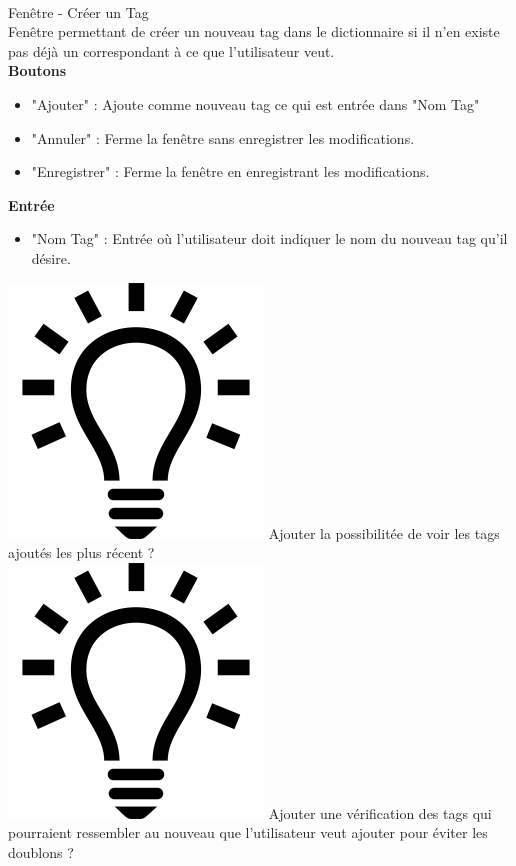 \documentclass[11pt,french,a4paper]{report}
\begin{document}
\dotfill \\

\Large Fenêtre - Créer un Tag\normalsize \\
    Fenêtre permettant de créer un nouveau tag dans le dictionnaire si il n'en existe pas déjà
    un correspondant à ce que l'utilisateur veut. \\
\large \textbf{Boutons}\normalsize
    \begin{itemize}[label=, leftmargin=*,parsep=0cm,itemsep=0cm,topsep=0cm]
        \item "Ajouter" : Ajoute comme nouveau tag ce qui est entrée dans "Nom Tag"
        \item "Annuler" : Ferme la fenêtre sans enregistrer les modifications.
        \item "Enregistrer" : Ferme la fenêtre en enregistrant les modifications.
    \end{itemize}
\large \textbf{Entrée}\normalsize
    \begin{itemize}[label=, leftmargin=*,parsep=0cm,itemsep=0cm,topsep=0cm]
        \item "Nom Tag" : Entrée où l'utilisateur doit indiquer le nom du nouveau tag qu'il désire.
    \end{itemize}
    \includegraphics[scale=0.05]{../images/logo/logo_ampoule} Ajouter la possibilitée de voir les tags ajoutés 
            les plus récent ? \\ 
    \includegraphics[scale=0.05]{../images/logo/logo_ampoule} Ajouter une vérification des tags qui pourraient 
    ressembler au nouveau que l'utilisateur veut ajouter pour éviter les doublons ? \\
\end{document}
